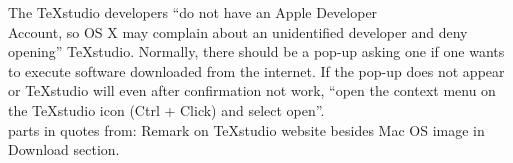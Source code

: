 				\begin{daInfoBox}
					The TeXstudio developers \enquote{do not have an Apple Developer\\ Account, so OS X may complain about an unidentified developer and deny opening} TeXstudio. Normally, there should be a pop-up asking one if one wants to execute software downloaded from the internet. If the pop-up does not appear or TeXstudio will even after confirmation not work, \enquote{open the context menu on the TeXstudio icon (Ctrl + Click) and select open}.\\[0.25cm]
					\footnotesize parts in quotes from: Remark on TeXstudio website besides Mac OS image in Download section. 
				\end{daInfoBox}
			